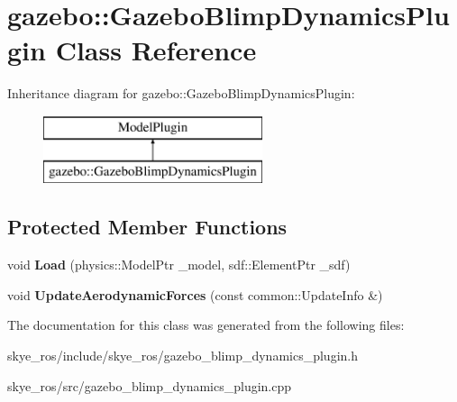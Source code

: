 \hypertarget{classgazebo_1_1_gazebo_blimp_dynamics_plugin}{\section{gazebo\-:\-:Gazebo\-Blimp\-Dynamics\-Plugin Class Reference}
\label{classgazebo_1_1_gazebo_blimp_dynamics_plugin}
}
Inheritance diagram for gazebo\-:\-:Gazebo\-Blimp\-Dynamics\-Plugin\-:\begin{figure}[H]
\begin{center}
\leavevmode
\includegraphics[height=2.000000cm]{classgazebo_1_1_gazebo_blimp_dynamics_plugin}
\end{center}
\end{figure}
\subsection*{Protected Member Functions}
\begin{DoxyCompactItemize}
\item 
\hypertarget{classgazebo_1_1_gazebo_blimp_dynamics_plugin_a3d0cbd15fdee85e1b1d2a5ee0962bc6b}{void {\bfseries Load} (physics\-::\-Model\-Ptr \-\_\-model, sdf\-::\-Element\-Ptr \-\_\-sdf)}\label{classgazebo_1_1_gazebo_blimp_dynamics_plugin_a3d0cbd15fdee85e1b1d2a5ee0962bc6b}

\item 
\hypertarget{classgazebo_1_1_gazebo_blimp_dynamics_plugin_aaa96cafa6a1d76eefd9f419806fadb24}{void {\bfseries Update\-Aerodynamic\-Forces} (const common\-::\-Update\-Info \&)}\label{classgazebo_1_1_gazebo_blimp_dynamics_plugin_aaa96cafa6a1d76eefd9f419806fadb24}

\end{DoxyCompactItemize}


The documentation for this class was generated from the following files\-:\begin{DoxyCompactItemize}
\item 
skye\-\_\-ros/include/skye\-\_\-ros/gazebo\-\_\-blimp\-\_\-dynamics\-\_\-plugin.\-h\item 
skye\-\_\-ros/src/gazebo\-\_\-blimp\-\_\-dynamics\-\_\-plugin.\-cpp\end{DoxyCompactItemize}
